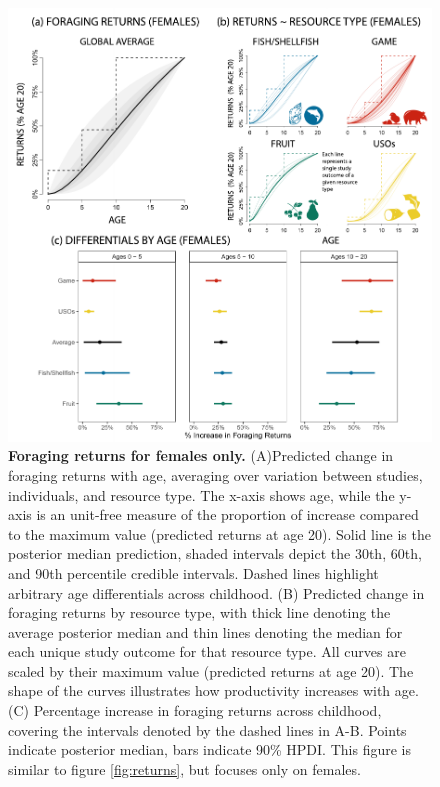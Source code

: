 \begin{figure}[h]
\centering
\includegraphics[width=12cm] {text/images/Figure_S3.pdf}
\renewcommand{\thefigure}{S\arabic{figure}}
\caption{\textbf{Foraging returns for females only.} (A)Predicted change in foraging returns with age, averaging over variation between studies, individuals, and resource type. The x-axis shows age, while the y-axis is an unit-free measure of the proportion of increase compared to the maximum value (predicted returns at age 20). Solid line is the posterior median prediction, shaded intervals depict the 30th, 60th, and 90th percentile credible intervals. Dashed lines highlight arbitrary age differentials across childhood. (B) Predicted change in foraging returns by resource type, with thick line denoting the average posterior median and thin lines denoting the median for each unique study outcome for that resource type. All curves are scaled by their maximum value (predicted returns at age 20). The shape of the curves illustrates how productivity increases with age. (C) Percentage increase in foraging returns across childhood, covering the intervals denoted by the dashed lines in A-B. Points indicate posterior median, bars indicate 90\% HPDI. This figure is similar to figure \ref{fig:returns}, but focuses only on females.}
\label{fig:females_only}
\end{figure}

